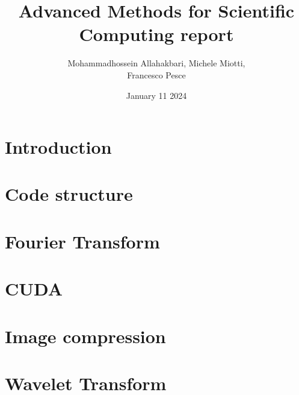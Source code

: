 \documentclass{article}
\title{Advanced Methods for Scientific Computing report}
\author{Mohammadhossein Allahakbari, Michele Miotti, \\Francesco Pesce}
\date{January 11 2024}
\begin{document}
\maketitle


\section{Introduction}
	

\section{Code structure}
	

\section{Fourier Transform}
	 

\section{CUDA}
	 

\section{Image compression}
	 

\section{Wavelet Transform}
	 




\end{document}
